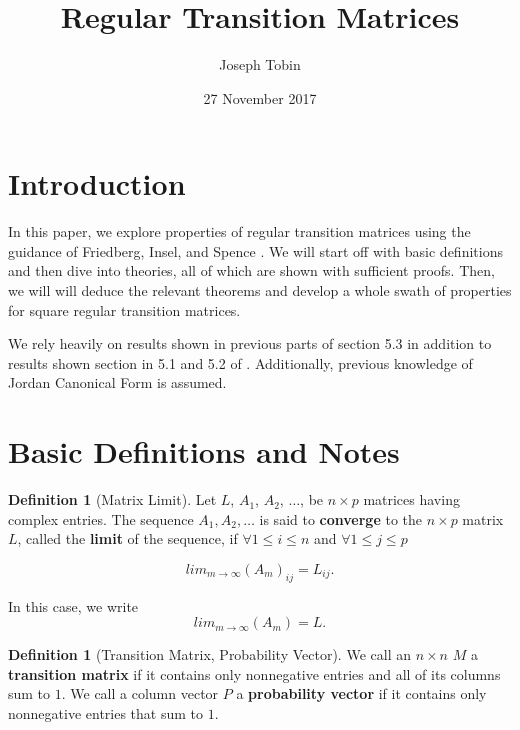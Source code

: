 \documentclass{amsart}
\title{Regular Transition Matrices}
\author{Joseph Tobin}
\date{27 November 2017}
\theoremstyle{definition}
\newtheorem{definition}[thm]{Definition}
\theoremstyle{remark}
\numberwithin{equation}{section}
\begin{document}
\maketitle




\section{Introduction}
In this paper, we explore properties of regular transition matrices using the guidance of Friedberg, Insel, and Spence \cite{friedberg2003linear}.
We will start off with basic definitions and then dive into theories, all of which are shown with sufficient proofs.
Then, we will will deduce the relevant theorems and develop a whole swath of properties for square regular transition matrices.


We rely heavily on results shown in previous parts of section 5.3 in addition to results shown section in 5.1 and 5.2 of \cite{friedberg2003linear}.
Additionally, previous knowledge of Jordan Canonical Form is assumed.

\section{Basic Definitions and Notes}

\begin{definition}[Matrix Limit]
Let $L$, $A_1$, $A_2$, $\ldots$, be $n \times p$ matrices having complex entries.
The sequence $A_1, A_2, \ldots$ is said to \textbf{converge} to the $n \times p$ matrix $L$, called the \textbf{limit} of the sequence, if $\forall 1 \leq i \leq n$ and $\forall 1 \leq j \leq p$

$$lim_{m \to \infty}(A_m)_{ij} = L_{ij}.$$

In this case, we write $$ lim_{m \to \infty}(A_m) = L.$$


\end{definition}


\begin{definition}[Transition Matrix, Probability Vector]
We call an $n \times n$ $M$ a \textbf{transition matrix} if it contains only nonnegative entries and all of its columns sum to $1$.
We call a column vector $P$ a \textbf{probability vector} if it contains only nonnegative entries that sum to $1$.
\end{definition}
\end{document}
